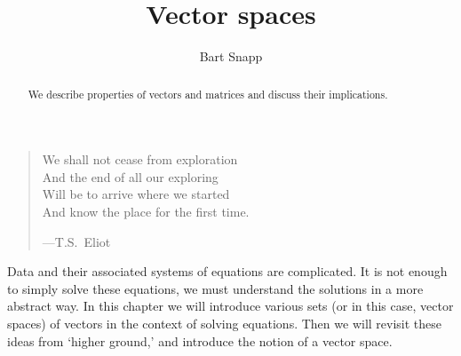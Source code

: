 \documentclass{ximera}
\author{Bart Snapp}
\title{Vector spaces}
\begin{document}
\begin{abstract}
  We describe properties of vectors and matrices and discuss their
  implications.
\end{abstract}
\maketitle

\begin{quote}
  We shall not cease from exploration\\
  And the end of all our exploring\\
  Will be to arrive where we started\\
  And know the place for the first time.

  \hfill ---T.S.\ Eliot
\end{quote}

Data and their associated systems of equations are complicated. It is
not enough to simply solve these equations, we must understand the
solutions in a more abstract way. In this chapter we will introduce
various sets (or in this case, vector spaces) of vectors in the
context of solving equations. Then we will revisit these ideas from
`higher ground,' and introduce the notion of a vector space.
\end{document}
